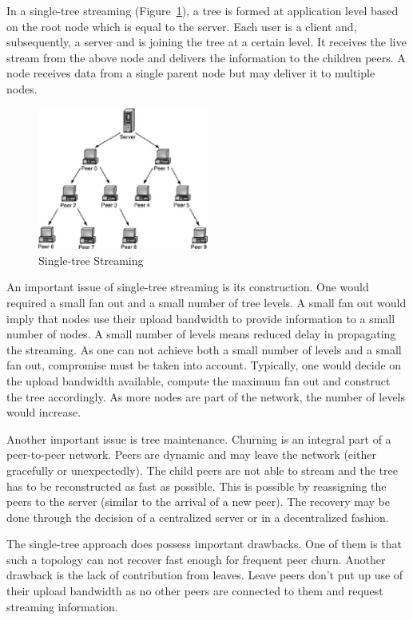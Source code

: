 In a single-tree streaming (Figure~\ref{fig:p2p-systems:single-tree-streaming}), a tree is
formed at application level based on the
root node which is equal to the server. Each user is a client and,
subsequently, a server and is joining the tree at a certain level. It receives
the live stream from the above node and delivers the information to the
children peers. A node receives data from a single parent node but may deliver
it to multiple nodes.

\begin{figure}
  \centering
  \includegraphics[width=0.5\textwidth]{src/img/p2p-systems/single-tree-streaming}
  \caption{Single-tree Streaming}
  \label{fig:p2p-systems:single-tree-streaming}
\end{figure}

An important issue of single-tree streaming is its construction. One would
required a small fan out and a small number of tree levels. A small fan out
would imply that nodes use their upload bandwidth to provide information to a
small number of nodes. A small number of levels means reduced delay in
propagating the streaming. As one can not achieve both a small number of
levels and a small fan out, compromise must be taken into account. Typically,
one would decide on the upload bandwidth available, compute the maximum fan
out and construct the tree accordingly. As more nodes are part of the network,
the number of levels would increase.

Another important issue is tree maintenance. Churning is an integral part of
a peer-to-peer network. Peers are dynamic and may leave the network (either
gracefully or unexpectedly). The child peers are not able to stream and the
tree has to be reconstructed as fast as possible. This is possible by
reassigning the peers to the server (similar to the arrival of a new peer).
The recovery may be done through the decision of a centralized server or in a
decentralized fashion.

The single-tree approach does possess important drawbacks. One of them is that
such a topology can not recover fast enough for frequent peer churn. Another
drawback is the lack of contribution from leaves. Leave peers don't put up use
of their upload bandwidth as no other peers are connected to them and request
streaming information.

